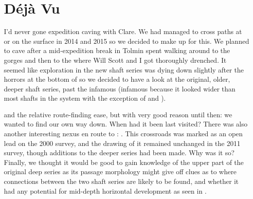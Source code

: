 \section{Déjà Vu}
\label{sec: déjà vu}

I'd never gone expedition caving with Clare. We had managed to cross paths at  or on the surface in 2014 and 2015 so we decided to make up for this. We planned to cave after a mid-expedition break in Tolmin spent walking around to the  gorges and then to the  where Will Scott and I got thoroughly drenched. It seemed like exploration in the new shaft series was dying down slightly after the horrors at the bottom of  so we decided to have a look at the original, older, deeper shaft series, past the infamous  (infamous because it looked wider than most shafts in the system with the exception of  and ).

 and the relative route-finding ease, but with very good reason until then: we wanted to find our own way down. When had it been last visited? There was also another interesting nexus en route to : . This crossroads was marked as an open lead on the 2000 survey, and the drawing of it remained unchanged in the 2011 survey, though additions to the deeper series had been made. Why was it so? Finally, we thought it would be good to gain knowledge of the upper part of the original deep series as its passage morphology might give off clues as to where connections between the two shaft series are likely to be found, and whether it had any potential for mid-depth horizontal development as seen in . 

